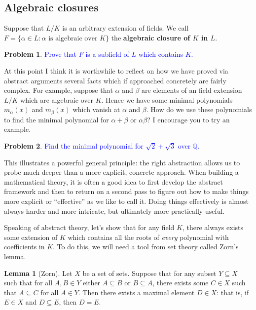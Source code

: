 \documentclass[11pt]{article}
\def\QQ{\mathbb{Q}}
\theoremstyle{definition}
\newtheorem{lemma}[theorem]{Lemma}
\newtheorem{problem}{Problem}[section]
\numberwithin{equation}{subsection}
\newcommand{\blue}[1]{\textcolor{blue}{#1}}
\begin{document}
\subsection{Algebraic closures}

Suppose that $L/K$ is an arbitrary extension of fields.
We call $F = \{\alpha \in L : \alpha \text{ is algebraic over $K$}\}$ the \textbf{algebraic closure of $K$ in $L$}.

\begin{problem}
    \blue{Prove that $F$ is a subfield of $L$ which contains $K$.}
\end{problem}

At this point I think it is worthwhile to reflect on how we have proved via abstract arguments several facts which if approached concretely are fairly complex.
For example, suppose that $\alpha$ and $\beta$ are elements of an field extension $L/K$ which are algebraic over $K$.
Hence we have some minimal polynomials $m_\alpha(x)$ and $m_\beta(x)$ which vanish at $\alpha$ and $\beta$.
How do we use these polynomials to find the minimal polynomial for $\alpha + \beta$ or $\alpha\beta$?
I encourage you to try an example.

\begin{problem}
    \blue{Find the minimal polynomial for $\sqrt{2} + \sqrt{3}$ over $\QQ$.}
\end{problem}

This illustrates a powerful general principle: the right abstraction allows us to probe much deeper than a more explicit, concrete approach.
When building a mathematical theory, it is often a good idea to first develop the abstract framework and then to return on a second pass to figure out how to make things more explicit or ``effective'' as we like to call it.
Doing things effectively is almost always harder and more intricate, but ultimately more practically useful.

Speaking of abstract theory, let's show that for any field $K$, there always exists some extension of $K$ which contains all the roots of \emph{every} polynomial with coefficients in $K$.
To do this, we will need a tool from set theory called Zorn's lemma.

\begin{lemma}[Zorn]
    Let $X$ be a set of sets.
    Suppose that for any subset $Y \subseteq X$ such that for all $A, B \in Y$ either $A \subseteq B$ or $B \subseteq A$, there exists some $C \in X$ such that $A \subseteq C$ for all $A \in Y$.
    Then there exists a maximal element $D \in X$: that is, if $E \in X$ and $D \subseteq E$, then $D = E$.
\end{lemma}
\end{document}
